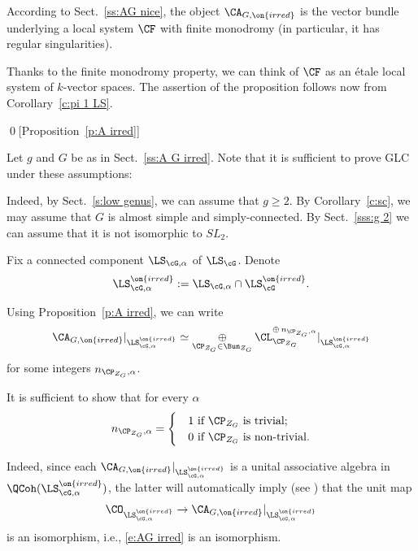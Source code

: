 \documentclass[9pt]{amsart}
\theoremstyle{remark}
\theoremstyle{definition}
\theoremstyle{remark}
\newcommand{\secref}[1]{Sect.~\ref{#1}}
\newcommand{\propref}[1]{Proposition~\ref{#1}}
\newcommand{\corref}[1]{Corollary~\ref{#1}}
\numberwithin{equation}{section}
\begin{document}
\sssec{Proof of \propref{p:A irred}}

According to \secref{ss:AG nice}, the object $\CA_{G,\on{irred}}$ is the vector bundle
underlying a local system $\CF$ with finite monodromy (in particular, 
it has regular singularities).

\medskip

Thanks to the finite monodromy property, we can think of $\CF$ as an \'etale local system of $k$-vector spaces. 
The assertion of the proposition follows now from \corref{c:pi 1 LS}. 

\qed[\propref{p:A irred}]

 \label{ss:proof of GLC}

Let $g$ and $G$ be as in \secref{ss:A G irred}. Note that it is sufficient to prove GLC under these assumptions:

\medskip

Indeed, by \secref{s:low genus}, we can assume that $g\geq 2$. By \corref{c:sc}, we may assume that $G$ is almost simple and 
simply-connected. By \secref{sss:g 2} we can assume that it is not isomorphic to $SL_2$. 


Fix a connected component $\LS_{\cG,\alpha}$ of $\LS_\cG$. Denote
$$\LS_{\cG,\alpha}^{\on{irred}}:=\LS_{\cG,\alpha}\cap \LS_\cG^{\on{irred}}.$$

\medskip

Using \propref{p:A irred}, we can write
\begin{equation} \label{e:decomp A}
\CA_{G,\on{irred}}|_{\LS_{\cG,\alpha}^{\on{irred}}}\simeq \underset{\CP_{Z_G}\in \Bun_{Z_G}}\oplus\, 
\CL^{\oplus\, n_{\CP_{Z_G},\alpha}}_{\CP_{Z_G}}|_{\LS_{\cG,\alpha}^{\on{irred}}}
\end{equation} 
for some integers $n_{\CP_{Z_G},\alpha}$. 

\medskip

It is sufficient to show that for every $\alpha$
$$
n_{\CP_{Z_G},\alpha}=
\begin{cases}
&1 \text{ if } \CP_{Z_G} \text{ is trivial};\\
&0 \text{ if } \CP_{Z_G} \text{ is non-trivial}.
\end{cases}
$$

Indeed, since each $\CA_{G,\on{irred}}|_{\LS_{\cG,\alpha}^{\on{irred}}}$ is a unital associative algebra in $\QCoh(\LS_{\cG,\alpha}^{\on{irred}})$,
the latter will automatically imply (see \cite[Lemma 17.3.7]{GLC3}) that the unit map
\begin{equation} \label{e:unit alpha irred}
\CO_{\LS_{\cG,\alpha}^{\on{irred}}}\to \CA_{G,\on{irred}}|_{\LS_{\cG,\alpha}^{\on{irred}}}
\end{equation}
is an isomorphism, i.e., \eqref{e:AG irred} is an isomorphism. 
\end{document}
